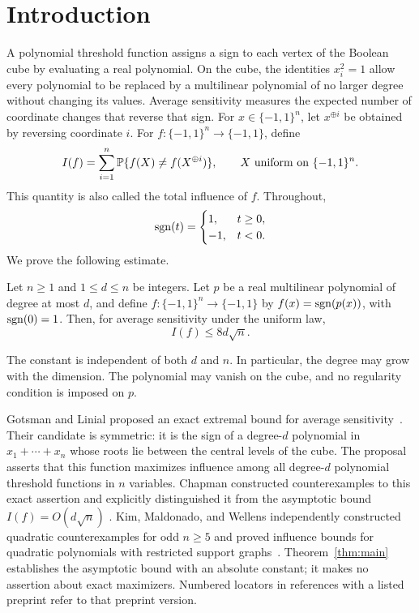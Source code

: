 \section{Introduction}\label{sec:introduction}

A polynomial threshold function assigns a sign to each vertex of the
Boolean cube by evaluating a real polynomial. On the cube, the identities
$x_i^2=1$ allow every polynomial to be replaced by a multilinear polynomial
of no larger degree without changing its values. Average sensitivity
measures the expected number of coordinate changes that reverse that sign.
For $x\in\{-1,1\}^n$, let $x^{\oplus i}$ be obtained by reversing
coordinate $i$. For $f:\{-1,1\}^n\to\{-1,1\}$, define
\begin{equation}\label{eq:influence-definition}
 I(f)=\sum_{i=1}^n\mathbb P\{f(X)\ne f(X^{\oplus i})\},
 \qquad X\text{ uniform on }\{-1,1\}^n.
\end{equation}
This quantity is also called the total influence of $f$. Throughout,
\[
 \operatorname{sgn}(t)=\begin{cases}1,&t\ge0,\\-1,&t<0.\end{cases}
\]
We prove the following estimate.

\begin{theorem}\label{thm:main}
Let $n\ge1$ and $1\le d\le n$ be integers. Let $p$ be a real multilinear
polynomial of degree at most $d$, and define
$f:\{-1,1\}^n\to\{-1,1\}$ by $f(x)=\operatorname{sgn}(p(x))$, with $\operatorname{sgn}(0)=1$.
Then, for average sensitivity under the uniform law,
\[
 I(f)\le 8d\sqrt n.
\]
\end{theorem}

The constant is independent of both $d$ and $n$. In particular, the degree
may grow with the dimension. The polynomial may vanish on the cube, and
no regularity condition is imposed on $p$.

Gotsman and Linial proposed an exact extremal bound for average
sensitivity~\cite[Section~5, p.~47]{GotsmanLinial1994}.
Their candidate is symmetric: it is the sign of a degree-$d$ polynomial
in $x_1+\cdots+x_n$ whose roots lie between the central levels of the
cube. The proposal asserts that this function maximizes influence among
all degree-$d$ polynomial threshold functions in $n$ variables.
Chapman constructed counterexamples to this exact assertion and
explicitly distinguished it from the asymptotic bound
$I(f)=O(d\sqrt n)$
\cite[Conjectures~1.1--1.2 and Theorem~1.1]{Chapman2018}.
Kim, Maldonado, and Wellens independently constructed quadratic
counterexamples for odd $n\ge5$ and proved influence bounds for
quadratic polynomials with restricted support
graphs~\cite[Theorems~1.1--1.3]{KimMaldonadoWellens2017}.
Theorem~\ref{thm:main} establishes the asymptotic bound with an absolute
constant; it makes no assertion about exact maximizers.
Numbered locators in references with a listed preprint refer to that
preprint version.

